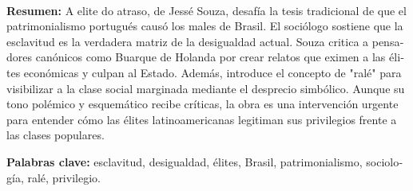\begin{textblock*}{68mm}
{\begin{minipage}[t]{68mm}
{\large
\href{https://bsky.app/intent/compose?text=https%3A%2F%2Far.pinterest.com%2Fpin%2F719239002970177904%2F}{}~
\href{mailto:?subject=Rese%C3%B1a%20bibliogr%C3%A1fica&body=https%3A%2F%2Far.pinterest.com%2Fpin%2F719239002970177904%2F}{}~
\href{https://www.facebook.com/sharer/sharer.php?u=https%3A%2F%2Far.pinterest.com%2Fpin%2F719239002970177904%2F}{}~
\href{https://www.linkedin.com/sharing/share-offsite/?url=https%3A%2F%2Far.pinterest.com%2Fpin%2F719239002970177904%2F}{}~
\href{https://www.reddit.com/submit?url=https%3A%2F%2Far.pinterest.com%2Fpin%2F719239002970177904%2F&title=Rese%C3%B1a%20bibliogr%C3%A1fica}{}~
\href{https://www.researchgate.net/search?q=Rese%C3%B1a%20bibliogr%C3%A1fica}{}~
\href{https://t.me/share/url?url=https%3A%2F%2Far.pinterest.com%2Fpin%2F719239002970177904%2F&text=Rese%C3%B1a%20bibliogr%C3%A1fica}{}~
\href{https://wa.me/?text=https%3A%2F%2Far.pinterest.com%2Fpin%2F719239002970177904%2F}{}~
\href{https://twitter.com/intent/tweet?url=https%3A%2F%2Far.pinterest.com%2Fpin%2F719239002970177904%2F&text=Rese%C3%B1a%20bibliogr%C3%A1fica}{}
}\par
\end{minipage}%
}%
\end{textblock*}


\begin{tcolorbox}[colback=brown!8!white,colframe=brown!8!white,boxrule=0pt,arc=2pt,left=4pt,right=4pt,top=3pt,bottom=3pt,before skip=4pt,after skip=4pt]
\begin{otherlanguage}{spanish}
\sffamily\small \textbf{Resumen:} A elite do atraso, de Jessé Souza, desafía la tesis tradicional de que el patrimonialismo portugués causó los males de Brasil. El sociólogo sostiene que la esclavitud es la verdadera matriz de la desigualdad actual. Souza critica a pensadores canónicos como Buarque de Holanda por crear relatos que eximen a las élites económicas y culpan al Estado. Además, introduce el concepto de "ralé" para visibilizar a la clase social marginada mediante el desprecio simbólico. Aunque su tono polémico y esquemático recibe críticas, la obra es una intervención urgente para entender cómo las élites latinoamericanas legitiman sus privilegios frente a las clases populares.
\par\smallskip\noindent\textbf{Palabras clave:} esclavitud, desigualdad, élites, Brasil, patrimonialismo, sociología, ralé, privilegio.
\end{otherlanguage}
\end{tcolorbox}

